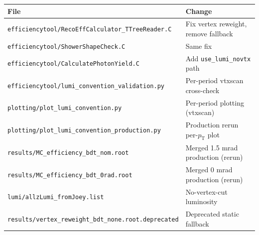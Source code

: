 \documentclass[11pt,letterpaper]{article}
\newcommand{\pT}{\ensuremath{p_{\text{T}}}}
\begin{document}
\begin{tabular}{ll}
\toprule
\textbf{File} & \textbf{Change} \\
\midrule
\texttt{efficiencytool/RecoEffCalculator\_TTreeReader.C} & Fix vertex reweight, remove fallback \\
\texttt{efficiencytool/ShowerShapeCheck.C}               & Same fix \\
\texttt{efficiencytool/CalculatePhotonYield.C}           & Add \texttt{use\_lumi\_novtx} path \\
\texttt{efficiencytool/lumi\_convention\_validation.py}  & Per-period vtxscan cross-check \\
\texttt{plotting/plot\_lumi\_convention.py}              & Per-period plotting (vtxscan) \\
\texttt{plotting/plot\_lumi\_convention\_production.py}  & Production rerun per-$\pT$ plot \\
\texttt{results/MC\_efficiency\_bdt\_nom.root}            & Merged 1.5 mrad production (rerun) \\
\texttt{results/MC\_efficiency\_bdt\_0rad.root}           & Merged 0 mrad production (rerun) \\
\texttt{lumi/allzLumi\_fromJoey.list}                    & No-vertex-cut luminosity \\
\texttt{results/vertex\_reweight\_bdt\_none.root.deprecated} & Deprecated static fallback \\
\bottomrule
\end{tabular}
\end{document}
